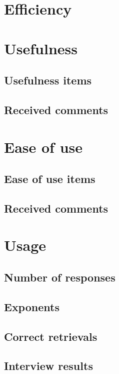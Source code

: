 \section{Efficiency}

\section{Usefulness}

\subsection{Usefulness items}

\subsection{Received comments}

\section{Ease of use}

\subsection{Ease of use items}

\subsection{Received comments}

\section{Usage}

\subsection{Number of responses}

\subsection{Exponents}

\subsection{Correct retrievals}

\subsection{Interview results}
